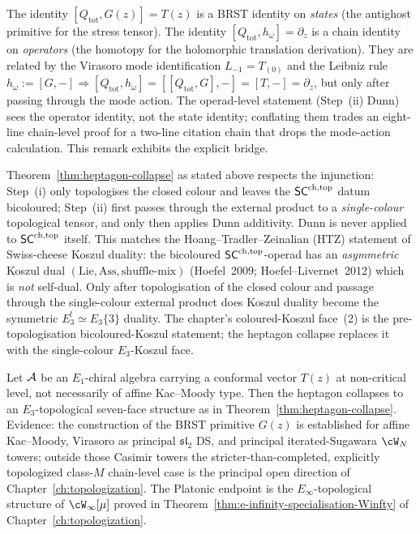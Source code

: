 \begin{remark}\label{rem:h-omega-vs-G-primitive}%
%
%
The identity $[Q_{\mathrm{tot}},G(z)]=T(z)$ is a BRST identity on
\emph{states} (the antighost primitive for the stress tensor). The
identity $[Q_{\mathrm{tot}},h_\omega]=\partial_z$
is a chain identity on \emph{operators} (the homotopy for the
holomorphic translation derivation). They are related by the
Virasoro mode identification $L_{-1}=T_{(0)}$ and the Leibniz rule
$h_\omega:=[G,-]\Rightarrow[Q_{\mathrm{tot}},h_\omega]
 =[[Q_{\mathrm{tot}},G],-]=[T,-]=\partial_z$, but only after
passing through the mode action. The operad-level statement
(Step~(ii) Dunn) sees the operator identity, not the state
identity; conflating them trades an eight-line chain-level proof
for a two-line citation chain that drops the mode-action
calculation. This remark exhibits the explicit bridge.
\end{remark}

\begin{remark}\label{rem:heptagon-collapse-bicoloured-scope}%
%
%
Theorem~\ref{thm:heptagon-collapse} as stated above respects the
injunction: Step~(i) only topologises the closed colour and leaves the
$\mathsf{SC}^{\mathrm{ch},\mathrm{top}}$ datum bicoloured; Step~(ii) first passes through the
external product to a \emph{single-colour} topological tensor, and only
then applies Dunn additivity. Dunn is never applied to $\mathsf{SC}^{\mathrm{ch},\mathrm{top}}$
itself. This matches the Hoang--Tradler--Zeinalian
(HTZ) statement of Swiss-cheese Koszul duality: the bicoloured
$\mathsf{SC}^{\mathrm{ch},\mathrm{top}}$-operad has an \emph{asymmetric} Koszul dual
$\mathrm{(Lie,Ass,\text{shuffle-mix})}$ (Hoefel~2009;
Hoefel--Livernet~2012) which is \emph{not} self-dual.
Only after topologisation of the closed colour and passage through the
single-colour external product does Koszul duality become the symmetric
$E_3^!\simeq E_3\{3\}$ duality. The chapter's coloured-Koszul
face~(2) is the pre-topologisation bicoloured-Koszul statement; the
heptagon collapse replaces it with the single-colour $E_3$-Koszul face.
\end{remark}

\begin{conjecture}
\label{conj:heptagon-collapse-general}%
Let $\mathcal{A}$ be an $E_1$-chiral algebra carrying a conformal vector
$T(z)$ at non-critical level, not necessarily of affine Kac--Moody
type. Then the heptagon collapses to an $E_3$-topological
seven-face structure as in Theorem~\ref{thm:heptagon-collapse}.
Evidence: the construction of the BRST primitive $G(z)$ is established
for affine Kac--Moody, Virasoro as principal $\mathfrak{sl}_2$ DS, and
principal iterated-Sugawara $\cW_N$ towers; outside those Casimir
towers the stricter-than-completed, explicitly topologized
class-$M$ chain-level case is the principal open direction of
Chapter~\ref{ch:topologization}. The
Platonic endpoint is the $E_\infty$-topological structure of
$\cW_\infty[\mu]$ proved in
Theorem~\ref{thm:e-infinity-specialisation-Winfty} of
Chapter~\ref{ch:topologization}.
\end{conjecture}

